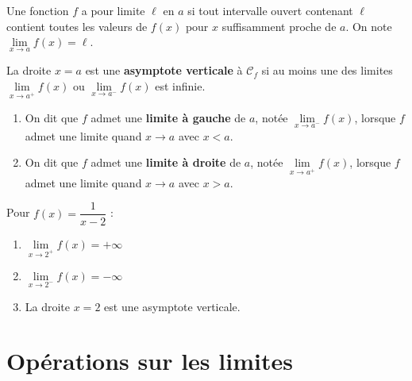 \documentclass[11pt,a4paper,openany]{book}
\theoremstyle{definition}
\begin{document}
    \begin{Définition}
        Une fonction $f$ a pour limite $\ell$ en $a$ si tout intervalle ouvert contenant
        $\ell$ contient toutes les valeurs de $f(x)$ pour $x$ suffisamment proche de $a$.
        On note $\lim\limits_{x\to a}f(x)=\ell$.
    \end{Définition}

    \begin{Définition}
        La droite $x=a$ est une \textbf{asymptote verticale} à $\mathcal{C}_f$ si au moins
        une des limites $\lim\limits_{x\to a^+}f(x)$ ou $\lim\limits_{x\to a^-}f(x)$ est
        infinie.
    \end{Définition}

    \begin{Définition}
        \begin{enumerate}
            \item On dit que $f$ admet une \textbf{limite à gauche} de $a$, notée
                  $\lim\limits_{x\to a^-}f(x)$, lorsque $f$ admet une limite quand $x\to a$
                  avec $x<a$.
            \item On dit que $f$ admet une \textbf{limite à droite} de $a$, notée
                  $\lim\limits_{x\to a^+}f(x)$, lorsque $f$ admet une limite quand $x\to a$
                  avec $x>a$.
        \end{enumerate}
    \end{Définition}

    \begin{Exemple}
        Pour $f(x)=\dfrac{1}{x-2}$ :
        \begin{enumerate}
            \item $\lim\limits_{x\to 2^+}f(x)=+\infty$
            \item $\lim\limits_{x\to 2^-}f(x)=-\infty$
            \item La droite $x=2$ est une asymptote verticale.
        \end{enumerate}
    \end{Exemple}

    \section{Opérations sur les limites}
\end{document}
